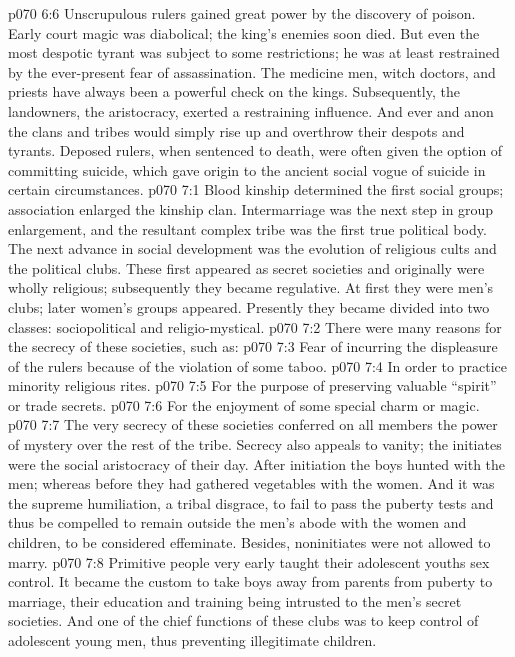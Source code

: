 \pc \vs p070 6:6 Unscrupulous rulers gained great power by the discovery of poison. Early court magic was diabolical; the king’s enemies soon died. But even the most despotic tyrant was subject to some restrictions; he was at least restrained by the ever\hyp{}present fear of assassination. The medicine men, witch doctors, and priests have always been a powerful check on the kings. Subsequently, the landowners, the aristocracy, exerted a restraining influence. And ever and anon the clans and tribes would simply rise up and overthrow their despots and tyrants. Deposed rulers, when sentenced to death, were often given the option of committing suicide, which gave origin to the ancient social vogue of suicide in certain circumstances.
\vs p070 7:1 Blood kinship determined the first social groups; association enlarged the kinship clan. Intermarriage was the next step in group enlargement, and the resultant complex tribe was the first true political body. The next advance in social development was the evolution of religious cults and the political clubs. These first appeared as secret societies and originally were wholly religious; subsequently they became regulative. At first they were men’s clubs; later women’s groups appeared. Presently they became divided into two classes: sociopolitical and religio\hyp{}mystical.
\pc \vs p070 7:2 There were many reasons for the secrecy of these societies, such as:
\pc \vs p070 7:3 \bibnobreakspace Fear of incurring the displeasure of the rulers because of the violation of some taboo.
\vs p070 7:4 \bibnobreakspace In order to practice minority religious rites.
\vs p070 7:5 \bibnobreakspace For the purpose of preserving valuable “spirit” or trade secrets.
\vs p070 7:6 \bibnobreakspace For the enjoyment of some special charm or magic.
\pc \vs p070 7:7 The very secrecy of these societies conferred on all members the power of mystery over the rest of the tribe. Secrecy also appeals to vanity; the initiates were the social aristocracy of their day. After initiation the boys hunted with the men; whereas before they had gathered vegetables with the women. And it was the supreme humiliation, a tribal disgrace, to fail to pass the puberty tests and thus be compelled to remain outside the men’s abode with the women and children, to be considered effeminate. Besides, noninitiates were not allowed to marry.
\pc \vs p070 7:8 Primitive people very early taught their adolescent youths sex control. It became the custom to take boys away from parents from puberty to marriage, their education and training being intrusted to the men’s secret societies. And one of the chief functions of these clubs was to keep control of adolescent young men, thus preventing illegitimate children.
